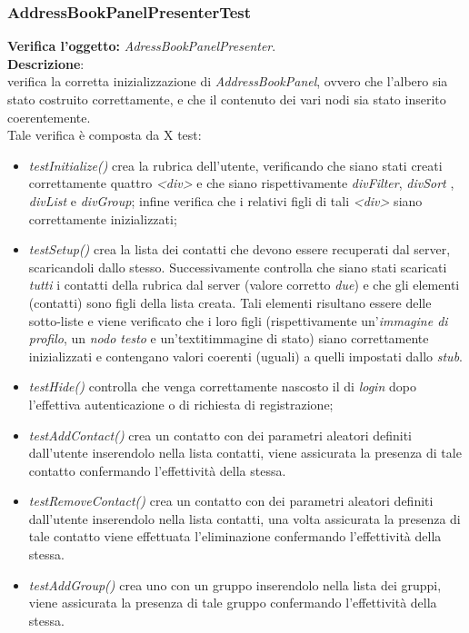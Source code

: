 \subsubsection{AddressBookPanelPresenterTest}
\textbf{Verifica l'oggetto:} \textit{AdressBookPanelPresenter}.\\
\textbf{Descrizione}:\\
verifica la corretta inizializzazione di \textit{AddressBookPanel}, ovvero che l'albero sia stato costruito correttamente, e che il contenuto dei vari nodi sia stato inserito coerentemente.\\
Tale verifica è composta da X test:
\begin{itemize}
\item \textit{testInitialize()} crea la rubrica dell'utente, verificando che siano stati creati correttamente quattro \textit{<div>} e che siano rispettivamente \textit{divFilter}, \textit{divSort} , \textit{divList} e \textit{divGroup}; infine verifica che i relativi figli di tali \textit{<div>} siano correttamente inizializzati;
\item \textit{testSetup() } crea la lista dei contatti che devono essere recuperati dal server, scaricandoli dallo stesso. Successivamente controlla che siano stati scaricati \textit{tutti} i contatti della rubrica dal server (valore corretto \textit{due}) e che gli elementi (contatti) sono figli della lista creata. Tali elementi risultano essere delle sotto-liste e viene verificato che i loro figli (rispettivamente un'\textit{immagine di profilo}, un \textit{nodo testo} e un'textit{immagine di stato}) siano correttamente inizializzati e contengano valori coerenti (uguali) a quelli impostati dallo \textit{stub}.
\item \textit{testHide() } controlla che venga correttamente nascosto il  di \textit{login} dopo l'effettiva autenticazione o di richiesta di registrazione;
\item \textit{testAddContact() } crea un contatto  con dei parametri aleatori definiti dall'utente inserendolo nella lista contatti, viene assicurata la presenza di tale contatto confermando l'effettività della stessa.
\item \textit{testRemoveContact() } crea un contatto  con dei parametri aleatori definiti dall'utente inserendolo nella lista contatti, una volta assicurata la presenza di tale contatto viene effettuata l'eliminazione confermando l'effettività della stessa.
\item \textit{testAddGroup() } crea uno  con un gruppo inserendolo nella lista dei gruppi, viene assicurata la presenza di tale gruppo confermando l'effettività della stessa.

\end{itemize}
